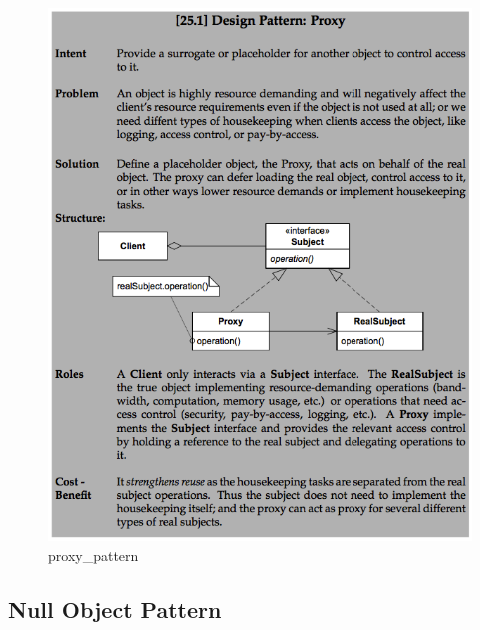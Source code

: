 \documentclass[11pt]{article}
\makeatletter
\def\maxwidth{\ifdim\Gin@nat@width>\linewidth\linewidth
    \else\Gin@nat@width\fi}
\let\Oldincludegraphics\includegraphics
\renewcommand{\includegraphics}[1]{\Oldincludegraphics[width=.8\maxwidth]{#1}}
\makeatother
\begin{document}
\begin{figure}
\centering
\includegraphics{img/proxy_pattern.png}
\caption{proxy\_pattern}
\end{figure}

\hypertarget{null-object-pattern}{%
\subsection{Null Object Pattern}\label{null-object-pattern}}
\end{document}
